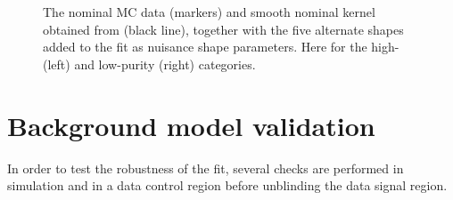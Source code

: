 \begin{figure}[h!]
\caption{The nominal MC data (markers) and smooth nominal kernel obtained from  (black line), together with the five alternate shapes added to the fit as nuisance shape parameters. Here for the high- (left) and low-purity (right) categories.}
\label{fig:searchIII:sys}
\end{figure}
\clearpage

\section{Background model validation}
\label{sec:search3:checks}
In order to test the robustness of the fit, several checks are performed in simulation and in a data control region before unblinding the data signal region.

